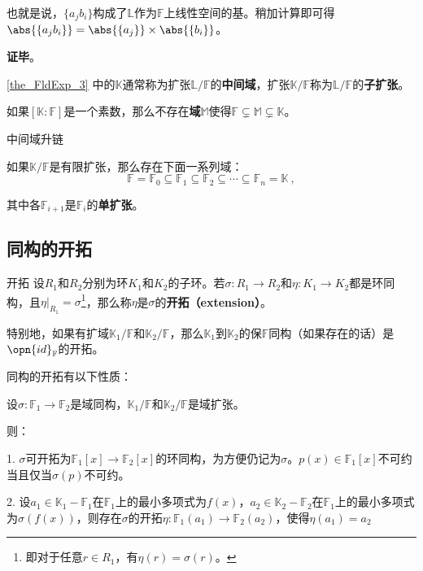 也就是说，$\{a_jb_i\}$构成了$\mathbb{L}$作为$\mathbb{F}$上线性空间的基。稍加计算即可得$\abs{\{a_jb_i\}}=\abs{\{a_j\}}\times\abs{\{b_i\}}$。





\textbf{证毕}。


\autoref{the_FldExp_3} 中的$\mathbb{K}$通常称为扩张$\mathbb{L}/\mathbb{F}$的\textbf{中间域}，扩张$\mathbb{K}/\mathbb{F}$称为$\mathbb{L}/\mathbb{F}$的\textbf{子扩张}。






\begin{corollary}{}
如果$[\mathbb{K}:\mathbb{F}]$是一个素数，那么不存在\textbf{域}$\mathbb{M}$使得$\mathbb{F}\subsetneq\mathbb{M}\subsetneq\mathbb{K}$。
\end{corollary}


\begin{corollary}{中间域升链}\label{cor_FldExp_3}

如果$\mathbb{K}/\mathbb{F}$是有限扩张，那么存在下面一系列域：
\begin{equation}
\mathbb{F}=\mathbb{F}_0\subseteq\mathbb{F}_1\subseteq\mathbb{F}_2\subseteq\cdots\subseteq\mathbb{F}_n=\mathbb{K}~,
\end{equation}

其中各$\mathbb{F}_{i+1}$是$\mathbb{F}_i$的\textbf{单扩张}。

\end{corollary}





\subsection{同构的开拓}

\begin{definition}{开拓}\label{def_FldExp_6}
设$R_1$和$R_2$分别为环$K_1$和$K_2$的子环。若$\sigma:R_1\to R_2$和$\eta:K_1\to K_2$都是环同构，且$\eta|_{R_1}=\sigma$\footnote{即对于任意$r\in R_1$，有$\eta(r)=\sigma(r)$。}，那么称$\eta$是$\sigma$的\textbf{开拓（extension）}。
\end{definition}

特别地，如果有扩域$\mathbb{K}_1/\mathbb{F}$和$\mathbb{K}_2/\mathbb{F}$，那么$\mathbb{K}_1$到$\mathbb{K}_2$的保$\mathbb{F}$同构（如果存在的话）是$\opn{id}_\mathbb{F}$的开拓。

同构的开拓有以下性质：

\begin{theorem}{}\label{the_FldExp_4}
设$\sigma:\mathbb{F}_1\to\mathbb{F}_2$是域同构，$\mathbb{K}_1/\mathbb{F}$和$\mathbb{K}_2/\mathbb{F}$是域扩张。

则：

1. $\sigma$可开拓为$\mathbb{F}_1[x]\to\mathbb{F}_2[x]$的环同构，为方便仍记为$\sigma$。$p(x)\in\mathbb{F}_1[x]$不可约当且仅当$\sigma(p)$不可约。

2. 设$a_1\in\mathbb{K}_1-\mathbb{F}_1$在$\mathbb{F}_1$上的最小多项式为$f(x)$，$a_2\in\mathbb{K}_2-\mathbb{F}_2$在$\mathbb{F}_1$上的最小多项式为$\sigma(f(x))$，则存在$\sigma$的开拓$\eta:\mathbb{F}_1(a_1)\to \mathbb{F}_2(a_2)$，使得$\eta(a_1)=a_2$
\end{theorem}

